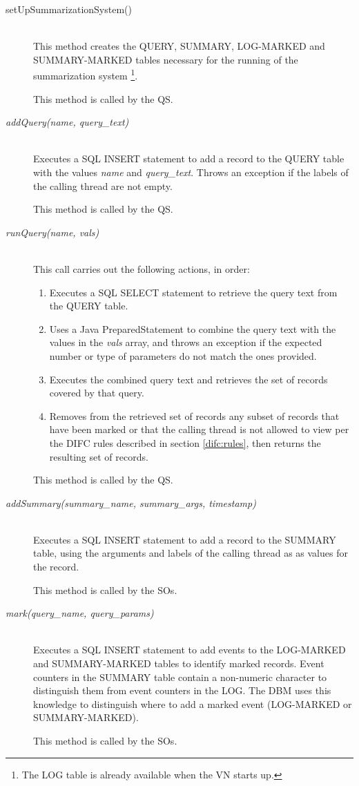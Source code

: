 \begin{description}
  \item[setUpSummarizationSystem()] \ \\
    This method creates the QUERY, SUMMARY,
    LOG-MARKED and SUMMARY-MARKED tables necessary
    for the running of the summarization system
    \footnote{The LOG table is already available 
      when the VN starts up.}.

    This method is called by the QS.
  \item[\emph{addQuery(name, query\_text)}] \ \\
    Executes a SQL INSERT statement to add a record
    to the QUERY table with the values \emph{name}
    and \emph{query\_text}.
    Throws an exception if the labels of the 
    calling thread are not empty.

    This method is called by the QS.
  \item[\emph{runQuery(name, vals)}] \ \\
    This call carries out the following actions,
    in order:
    \begin{enumerate}
      \item Executes a SQL SELECT statement to retrieve 
        the query text from the QUERY table.
      \item Uses a Java PreparedStatement to combine
        the query text with the values in the 
        \emph{vals} array,
        and throws an exception if the expected
        number or type of parameters do not match
        the ones provided.
      \item Executes the combined query text and
        retrieves the set of records covered by that query.
      \item Removes from the retrieved set of records
        any subset of records that have been marked or that
        the calling thread is not allowed
        to view per the DIFC rules described in section
        \ref{difc:rules}, then returns the resulting
        set of records.
    \end{enumerate}
    This method is called by the QS.
  \item[\emph{addSummary(summary\_name, summary\_args, timestamp)}] \ \\
    Executes a SQL INSERT statement to add a record to
    the SUMMARY table, using the arguments and labels
    of the calling thread as as values for the record.
    
    This method is called by the SOs.
  \item[\emph{mark(query\_name, query\_params)}] \ \\
    Executes a SQL INSERT statement to add events
    to the LOG-MARKED and SUMMARY-MARKED tables to
    identify marked records.
    Event counters in the SUMMARY table contain
    a non-numeric character to distinguish them from
    event counters in the LOG. The DBM uses 
    this knowledge to distinguish
    where to add a marked event (LOG-MARKED or 
    SUMMARY-MARKED).
    
    This method is called by the SOs.
\end{description}

